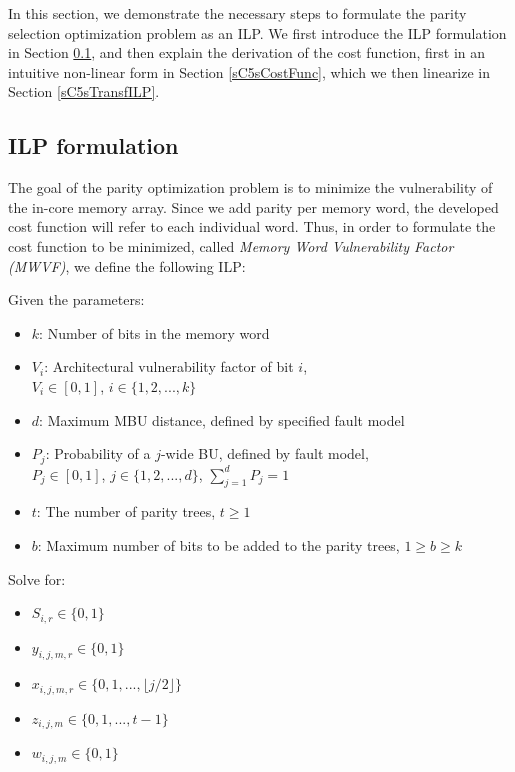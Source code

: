 \documentclass[12pt]{yalephd}
\begin{document}
In this section, we demonstrate the necessary steps to formulate the parity selection optimization problem as an ILP. We first introduce the ILP formulation in Section \ref{sC5sILPvar}, and then explain the derivation of the cost function, first in an intuitive non-linear form in Section \ref{sC5sCostFunc}, which we then linearize in Section \ref{sC5sTransfILP}.


\subsection{ILP formulation}\label{sC5sILPvar}

The goal of the parity optimization problem is to minimize the vulnerability of the in-core memory array. Since we add parity per memory word, the developed cost function will refer to each individual word. Thus, in order to formulate the cost function to be minimized, called {\it Memory Word Vulnerability Factor (MWVF)}, we define the following ILP:

\noindent Given the parameters:
\begin{itemize}\itemsep4pt
	
\item $k$: Number of bits in the memory word

\item $V_i$: Architectural vulnerability factor of bit $i$,\\$V_i \in [0,1]$, $i \in \{1, 2, ..., k\}$

\item $d$: Maximum MBU distance, defined by specified fault model

\item $P_j$: Probability of a $j$-wide BU, defined by fault model,\\$P_j \in [0,1]$, $j \in \{1, 2, ..., d\}$, $\sum_{j=1}^{d} P_j = 1$

\item $t$: The number of parity trees, $t \geq 1$

\item $b$: Maximum number of bits to be added to the parity trees, $1 \geq b \geq k$

\end{itemize}

\noindent Solve for:
\begin{itemize}\itemsep4pt
	\item $S_{i,r} \in \{0,1\}$
	\item $y_{i,j,m,r} \in \{0,1\}$
	\item $x_{i,j,m,r} \in \{0,1,...,\lfloor j/2 \rfloor\}$
	\item $z_{i,j,m} \in \{0, 1, ..., t-1\}$
	\item $w_{i,j,m} \in \{0, 1\}$
\end{itemize}
\end{document}
